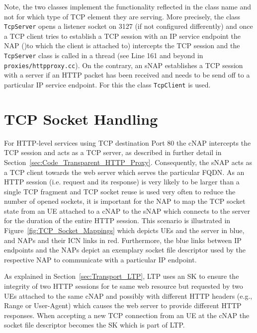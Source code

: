 \documentclass[a4paper,11pt,titlepage]{report}
\begin{document}
Note, the two classes implement the functionality reflected in the class name and not for which type of TCP element they are serving. More precisely, the class \texttt{TcpServer} opens a listener socket on 3127 (if not configured differently) and once a TCP client tries to establish a TCP session with an IP service endpoint the \ac{NAP} ()to which the client is attached to) intercepts the TCP session and the \texttt{TcpServer} class is called in a thread (see Line 161 and beyond in \texttt{proxies/httpproxy.cc}). On the contrary, an \ac{sNAP} establishes a TCP session with a server if an HTTP packet has been received and needs to be send off to a particular IP service endpoint. For this the class \texttt{TcpClient} is used.
\section{TCP Socket Handling}
For \ac{HTTP}-level services using \ac{TCP} destination Port 80 the \ac{cNAP} intercepts the \ac{TCP} session and acts as a \ac{TCP} server, as described in further detail in Section~\ref{sec:Code_Transparent_HTTP_Proxy}. Consequently, the \ac{sNAP} acts as a \ac{TCP} client towards the web server which serves the particular \ac{FQDN}. As an \ac{HTTP} session (i.e. request and its response) is very likely to be larger than a single \ac{TCP} fragment and \ac{TCP} socket reuse is used very often to reduce the number of opened sockets, it is important for the \ac{NAP} to map the \ac{TCP} socket state from an \ac{UE} attached to a \ac{cNAP} to the \ac{sNAP} which connects to the server for the duration of the entire \ac{HTTP} session. This scenario is illustrated in Figure~\ref{fig:TCP_Socket_Mappings} which depicts \acp{UE} and the server in blue, and \acp{NAP} and their \ac{ICN} links in red. Furthermore, the blue links between IP endpoints and the \acp{NAP} depict an exemplary socket file descriptor used by the respective \ac{NAP} to communicate with a particular IP endpoint.

As explained in Section~\ref{sec:Transport_LTP}, \ac{LTP} uses an \ac{SK} to ensure the integrity of two \ac{HTTP} sessions for te same web resource but requested by two \acp{UE} attached to the same \ac{cNAP} and possibly with different \ac{HTTP} headers (e.g., Range or User-Agent) which causes the web server to provide different \ac{HTTP} responses. When accepting a new \ac{TCP} connection from an \ac{UE} at the \ac{cNAP} the socket file descriptor becomes the \ac{SK} which is part of \ac{LTP}.
\end{document}
